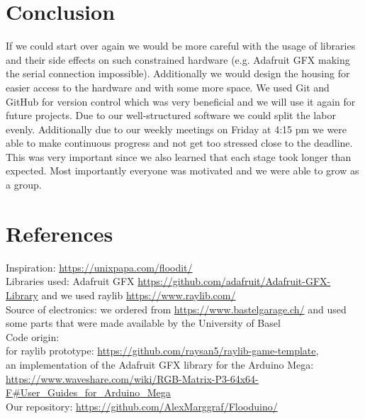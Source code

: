 \documentclass[10pt, a4paper]{article}
\begin{document}
\section*{Conclusion}

If we could start over again we would be more careful with the usage of libraries and their side effects on such constrained hardware (e.g. Adafruit GFX making the serial connection impossible). 
Additionally we would design the housing for easier access to the hardware and with some more space. We used Git and GitHub for version control which was very beneficial and we will use it again for future projects. Due to our well-structured software we could split the labor evenly. Additionally due to our weekly meetings on Friday at 4:15 pm we were able to make continuous progress and not get too stressed close to the deadline. This was very important since we also learned that each stage took longer than expected. 
Most importantly everyone was motivated and we were able to grow as a group. 


\section*{References}
\label{sec:references}
Inspiration: \url{https://unixpapa.com/floodit/} \\
Libraries used: Adafruit GFX \url{https://github.com/adafruit/Adafruit-GFX-Library} and we used raylib \url{https://www.raylib.com/} \\
Source of electronics: we ordered from \url{https://www.bastelgarage.ch/} and used some parts that were made available by the University of Basel \\
Code origin: \\
for raylib prototype: \url{https://github.com/raysan5/raylib-game-template}, \\
an implementation of the Adafruit GFX library for the Arduino Mega: \url{https://www.waveshare.com/wiki/RGB-Matrix-P3-64x64-F#User_Guides_for_Arduino_Mega} \\
Our repository: \url{https://github.com/AlexMarggraf/Flooduino/}
\end{document}
